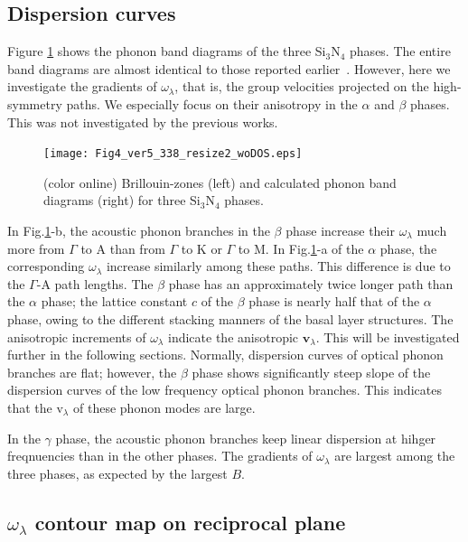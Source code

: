 \documentclass[twocolumn,amsmath,amssymb,a4paper,prb,superscriptaddress,floatfix]{revtex4-1}
\begin{document}
\subsection{Dispersion curves}

Figure \ref{fig:Fig4_ver5_338} shows the phonon band diagrams of the three
Si$_3$N$_4$ phases. The entire band diagrams are almost identical to those
reported earlier~\cite{kuwabara,xu}. However, here we investigate the gradients
of $\omega_\lambda$, that is, the group velocities projected on the
high-symmetry paths. We especially focus on their anisotropy in the $\alpha$ and
$\beta$ phases. This was not investigated by the previous works.

\begin{figure}[ht]
 \begin{center}
  \texttt{[image: Fig4\_ver5\_338\_resize2\_woDOS.eps]}
  \caption{(color online) Brillouin-zones (left) and calculated phonon band diagrams (right) for three Si$_3$N$_4$ phases.
  \label{fig:Fig4_ver5_338} }
 \end{center}
\end{figure}

In Fig.\ref{fig:Fig4_ver5_338}-b, the acoustic phonon branches in the $\beta$
phase increase their $\omega_\lambda$ much more from $\Gamma$ to A than from
$\Gamma$ to K or $\Gamma$ to M. In Fig.\ref{fig:Fig4_ver5_338}-a of the $\alpha$
phase, the corresponding $\omega_\lambda$ increase similarly among these paths.
This difference is due to the $\Gamma$-A path lengths.  The $\beta$ phase has an
approximately twice longer path than the $\alpha$ phase; the lattice constant
$c$ of the $\beta$ phase is nearly half that of the $\alpha$ phase, owing to the
different stacking manners of the basal layer structures.  The anisotropic
increments of $\omega_\lambda$ indicate the anisotropic $\mathbf{v}_\lambda$.
This will be investigated further in the following sections.  Normally,
dispersion curves of optical
phonon branches are flat; however, the $\beta$ phase shows significantly steep
slope of the dispersion curves of the low frequency optical phonon branches.
This indicates that the \rm{v}$_{\lambda}$ of these phonon modes are large.

In the $\gamma$ phase, the acoustic phonon branches keep linear dispersion at
hihger freqnuencies than in the other phases.  The gradients of $\omega_\lambda$
are largest among the three phases, as expected by the largest $B$.

\subsection{$\omega_\lambda$ contour map on reciprocal plane}
\end{document}
